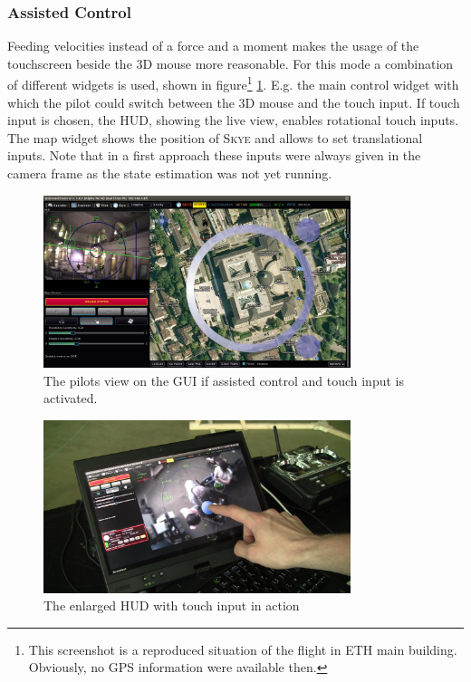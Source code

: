\subsubsection{Assisted Control}
Feeding velocities instead of a force and a moment makes the usage of the touchscreen beside the 3D mouse more reasonable. For this mode a combination of different widgets is used, shown in figure\footnote{This screenshot is a reproduced situation of the flight in ETH main building. Obviously, no GPS information were available then.} \ref{fig:qgc_manual_control}. E.g. the main control widget with which the pilot could switch between the 3D mouse and the touch input. If touch input is chosen, the HUD, showing the live view, enables rotational touch inputs. The map widget shows the position of \textsc{Skye} and allows to set translational inputs. Note that in a first approach these inputs were always given in the camera frame as the state estimation was not yet running.

\begin{figure}[H] %
	\begin{center}
		\includegraphics[width=0.8\textwidth]{qgc_manual_control}
		\caption{The pilots view on the GUI if assisted  control and touch input is activated.}  
		\label{fig:qgc_manual_control}		
	\end{center}
\end{figure}

\begin{figure}[H] %
	\begin{center}
		\includegraphics[width=0.8\textwidth]{graphics/TouchInput}
		\caption{The enlarged HUD with touch input in action}  
		\label{fig:touchInput}		
	\end{center}
\end{figure}


